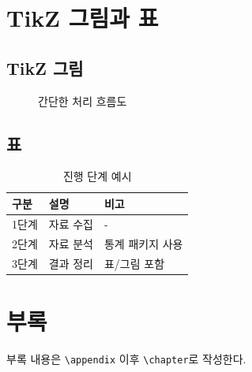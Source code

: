 \documentclass[a4paper,11pt]{report}
\begin{document}
\chapter{TikZ 그림과 표}

\section{TikZ 그림}
\begin{figure}[H]
  \centering
  \caption{간단한 처리 흐름도}
\end{figure}

\section{표}
\begin{table}[H]
  \centering
  \begin{tabular}{lll}
    \toprule
    구분 & 설명 & 비고 \\
    \midrule
    1단계 & 자료 수집 & - \\
    2단계 & 자료 분석 & 통계 패키지 사용 \\
    3단계 & 결과 정리 & 표/그림 포함 \\
    \bottomrule
  \end{tabular}
  \caption{진행 단계 예시}
\end{table}

\appendix
\chapter{부록}
부록 내용은 \verb|\appendix| 이후 \verb|\chapter|로 작성한다.
\end{document}
